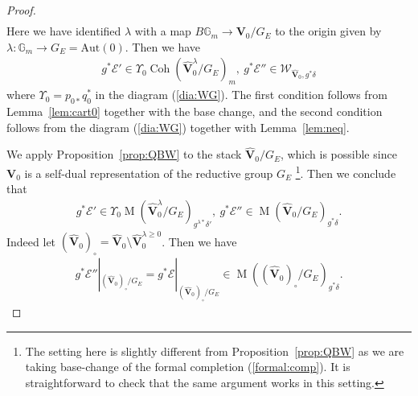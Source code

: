 \documentclass [11pt,oneside,a4paper,mathscr]{amsart}
\theoremstyle{definition}
\renewcommand{\geq}{\geqslant}
\newcommand{\E}{\mathcal{E}}
\newcommand{\MM}{\operatorname{M}}
\newcommand{\bgm}{B\mathbb{G}_m}
\newcommand{\Coh}{\operatorname{Coh}}
\begin{document}
\begin{proof}
\begin{align*}
\end{align*}
Here we have identified $\lambda$ with a map 
$\bgm \to \mathbf{V}_0/G_E$ 
to the origin given by 
$\lambda \colon \mathbb{G}_m\to G_E=\mathrm{Aut}(0)$. 
Then we have 
\begin{align}\label{cond:g*E}
    g^{\ast}\E' \in \Upsilon_0 \Coh(\widehat{\mathbf{V}}_0^{\lambda}/G_E)_m, \ 
    g^{\ast}\E'' \in \mathcal{W}_{\widehat{\mathbf{V}}_0, g^{\ast}\delta}
\end{align}
where $\Upsilon_0=p_{0\ast}q_0^{\ast}$ in the diagram (\ref{dia:WG}). 
The first condition follows from Lemma~\ref{lem:cart0} together with the base change, 
and the second condition follows from the diagram (\ref{dia:WG}) together with 
Lemma~\ref{lem:neq}. 

We apply Proposition~\ref{prop:QBW} to the stack $\widehat{\mathbf{V}}_0/G_E$, 
which is possible since $\mathbf{V}_0$ is a self-dual representation of the reductive group $G_E$
\footnote{The setting here is slightly different from Proposition~\ref{prop:QBW} as we 
are taking base-change of the formal completion (\ref{formal:comp}). It is straightforward 
to check that the same argument works in this setting.}. 
Then we conclude that 
\begin{align}\label{ets:E2}
    g^{\ast}\mathcal{E}' \in \Upsilon_0 \MM(\widehat{\mathbf{V}}_0^{\lambda}/G_E)_{g^{\lambda\ast}\delta'}, \ 
    g^{\ast}\mathcal{E}'' \in \MM(\widehat{\mathbf{V}}_0/G_E)_{g^{\ast}\delta}. 
\end{align}
Indeed let $(\widehat{\mathbf{V}}_0)_{\circ}=\widehat{\mathbf{V}}_0 \setminus \widehat{\mathbf{V}}_0^{\lambda \geq 0}$. Then we have 
\begin{align*}
    g^{*}\mathcal{E}''|_{(\widehat{\mathbf{V}}_0)_{\circ}/G_E} =g^{*}\mathcal{E}|_{(\widehat{\mathbf{V}}_0)_{\circ}/G_E} \in \MM((\widehat{\mathbf{V}}_0)_{\circ}/G_E)_{g^{\ast}\delta}.
\end{align*}


\end{proof}
\end{document}
